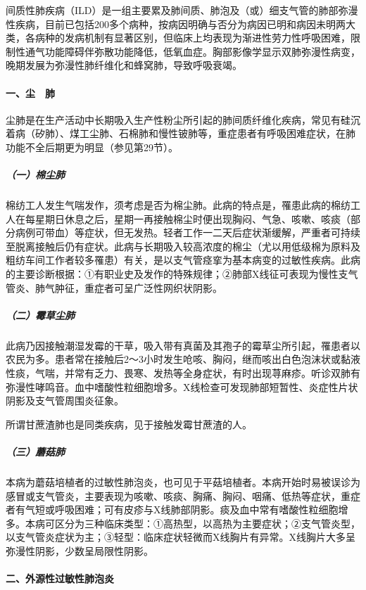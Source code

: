 间质性肺疾病（ILD）是一组主要累及肺间质、肺泡及（或）细支气管的肺部弥漫性疾病，目前已包括200多个病种，按病因明确与否分为病因已明和病因未明两大类，各病种的发病机制有显著区别，但临床上均表现为渐进性劳力性呼吸困难，限制性通气功能障碍伴弥散功能降低，低氧血症。胸部影像学显示双肺弥漫性病变，晚期发展为弥漫性肺纤维化和蜂窝肺，导致呼吸衰竭。

\paragraph{一、尘　肺}

尘肺是在生产活动中长期吸入生产性粉尘所引起的肺间质纤维化疾病，常见有硅沉着病（矽肺）、煤工尘肺、石棉肺和慢性铍肺等，重症患者有呼吸困难症状，在肺功能不全后期更为明显（参见第29节）。

\subparagraph{（一）棉尘肺}

棉纺工人发生气喘发作，须考虑是否为棉尘肺。此病的特点是，罹患此病的棉纺工人在每星期日休息之后，星期一再接触棉尘时便出现胸闷、气急、咳嗽、咳痰（部分病例可带血）等症状，但无发热。轻者工作一二天后症状渐缓解，严重者可持续至脱离接触后仍有症状。此病与长期吸入较高浓度的棉尘（尤以用低级棉为原料及粗纺车间工作者较多罹患）有关，是以支气管痉挛为基本病变的过敏性疾病。此病的主要诊断根据：①有职业史及发作的特殊规律；②肺部X线征可表现为慢性支气管炎、肺气肿征，重症者可呈广泛性网织状阴影。

\subparagraph{（二）霉草尘肺}

此病乃因接触潮湿发霉的干草，吸入带有真菌及其孢子的霉草尘所引起，罹患者以农民为多。患者常在接触后2～3小时发生呛咳、胸闷，继而咳出白色泡沫状或黏液性痰，气喘，并常有乏力、畏寒、发热等全身症状，有时出现荨麻疹。听诊双肺有弥漫性哮鸣音。血中嗜酸性粒细胞增多。X线检查可发现肺部短暂性、炎症性片状阴影及支气管周围炎征象。

所谓甘蔗渣肺也是同类疾病，见于接触发霉甘蔗渣的人。

\subparagraph{（三）蘑菇肺}

本病为蘑菇培植者的过敏性肺泡炎，也可见于平菇培植者。本病开始时易被误诊为感冒或支气管炎，主要表现为咳嗽、咳痰、胸痛、胸闷、咽痛、低热等症状，重症者有气短或呼吸困难；可有皮疹与X线肺部阴影。痰及血中常有嗜酸性粒细胞增多。本病可区分为三种临床类型：①高热型，以高热为主要症状；②支气管炎型，以支气管炎症状为主；③轻型：临床症状轻微而X线胸片有异常。X线胸片大多呈弥漫性阴影，少数呈局限性阴影。

\paragraph{二、外源性过敏性肺泡炎}

